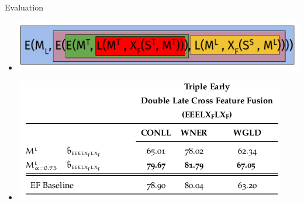 \documentclass[10pt,=table]{beamer}
\begin{document}
\begin{frame}[t]{Evaluation}




\begin{center}
\begin{itemize}
\item[] \includegraphics[width=1\linewidth]{image2/Chapitre2/hybrid_fusiona_trim.pdf}%
\item[] \includegraphics[width=1\linewidth]{image2/Chapitre4/hf_trim.png}
\end{itemize}




\end{center}



\vspace{\textheight}
\end{frame}
\end{document}

